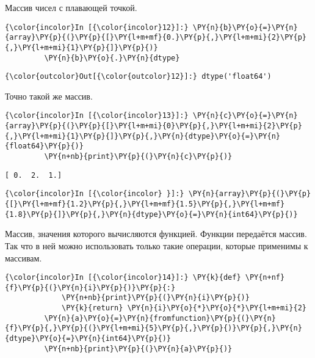     Массив чисел с плавающей точкой.

    \begin{Verbatim}[commandchars=\\\{\}]
{\color{incolor}In [{\color{incolor}12}]:} \PY{n}{b}\PY{o}{=}\PY{n}{array}\PY{p}{(}\PY{p}{[}\PY{l+m+mf}{0.}\PY{p}{,}\PY{l+m+mi}{2}\PY{p}{,}\PY{l+m+mi}{1}\PY{p}{]}\PY{p}{)}
         \PY{n}{b}\PY{o}{.}\PY{n}{dtype}
\end{Verbatim}

            \begin{Verbatim}[commandchars=\\\{\}]
{\color{outcolor}Out[{\color{outcolor}12}]:} dtype('float64')
\end{Verbatim}
        
    Точно такой же массив.

    \begin{Verbatim}[commandchars=\\\{\}]
{\color{incolor}In [{\color{incolor}13}]:} \PY{n}{c}\PY{o}{=}\PY{n}{array}\PY{p}{(}\PY{p}{[}\PY{l+m+mi}{0}\PY{p}{,}\PY{l+m+mi}{2}\PY{p}{,}\PY{l+m+mi}{1}\PY{p}{]}\PY{p}{,}\PY{n}{dtype}\PY{o}{=}\PY{n}{float64}\PY{p}{)}
         \PY{n+nb}{print}\PY{p}{(}\PY{n}{c}\PY{p}{)}
\end{Verbatim}

    \begin{Verbatim}[commandchars=\\\{\}]
[ 0.  2.  1.]

    \end{Verbatim}

    \begin{Verbatim}[commandchars=\\\{\}]
{\color{incolor}In [{\color{incolor} }]:} \PY{n}{array}\PY{p}{(}\PY{p}{[}\PY{l+m+mf}{1.2}\PY{p}{,}\PY{l+m+mf}{1.5}\PY{p}{,}\PY{l+m+mf}{1.8}\PY{p}{]}\PY{p}{,}\PY{n}{dtype}\PY{o}{=}\PY{n}{int64}\PY{p}{)}
\end{Verbatim}

    Массив, значения которого вычисляются функцией. Функции передаётся
массив. Так что в ней можно использовать только такие операции, которые
применимы к массивам.

    \begin{Verbatim}[commandchars=\\\{\}]
{\color{incolor}In [{\color{incolor}14}]:} \PY{k}{def} \PY{n+nf}{f}\PY{p}{(}\PY{n}{i}\PY{p}{)}\PY{p}{:}
             \PY{n+nb}{print}\PY{p}{(}\PY{n}{i}\PY{p}{)}
             \PY{k}{return} \PY{n}{i}\PY{o}{*}\PY{o}{*}\PY{l+m+mi}{2}
         \PY{n}{a}\PY{o}{=}\PY{n}{fromfunction}\PY{p}{(}\PY{n}{f}\PY{p}{,}\PY{p}{(}\PY{l+m+mi}{5}\PY{p}{,}\PY{p}{)}\PY{p}{,}\PY{n}{dtype}\PY{o}{=}\PY{n}{int64}\PY{p}{)}
         \PY{n+nb}{print}\PY{p}{(}\PY{n}{a}\PY{p}{)}
\end{Verbatim}

